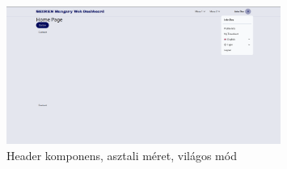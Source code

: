 \documentclass[a4paper]{article}
\begin{document}
\begin{figure}[ht]
  \centering
  \includegraphics[width = 0.8\textwidth]{images/header.png}
  \caption{Header komponens, asztali méret, világos mód}
  \label{fig:header_component}
\end{figure}
\begin{center}
\end{center}
\end{document}
